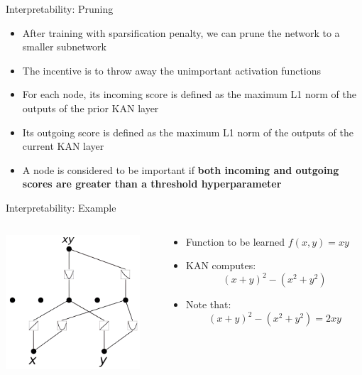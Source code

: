 \begin{frame}{Interpretability: Pruning}
    \begin{itemize}
        \item After training with sparsification penalty, we can prune the network to a smaller subnetwork \vspace{0.5em}
        \item The incentive is to throw away the unimportant activation functions \vspace{0.5em}
        \item For each node, its incoming score is defined as the maximum L1 norm of the outputs of the prior KAN layer \vspace{0.5em}
        \item Its outgoing score is defined as the maximum L1 norm of the outputs of the current KAN layer \vspace{0.5em}
        \item A node is considered to be important if \textbf{both incoming and outgoing scores are greater than a threshold hyperparameter} \vspace{0.5em}
    \end{itemize}
\end{frame}

\begin{frame}{Interpretability: Example}
    \begin{columns}
        \begin{column}{6cm}
            \begin{center}
                \includegraphics[width=5cm]{contents/images/pruning_example}
            \end{center}
        \end{column}

        \begin{column}{6cm}
            \begin{itemize}
                \item Function to be learned $f(x,y) = xy$ \vspace{1em}
                \item KAN computes: $$(x+y)^2 - (x^2+y^2)$$
                \item Note that: $$(x+y)^2 - (x^2+y^2) = 2xy$$
            \end{itemize}
        \end{column}
    \end{columns}
\end{frame}

